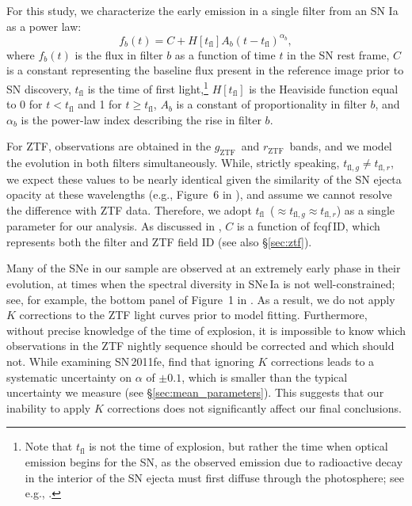 \documentclass[twocolumn]{./aastex63}
\newcommand{\rztf}{$r_\mathrm{ZTF}$}
\newcommand{\gztf}{$g_\mathrm{ZTF}$}
\newcommand{\tfl}{$t_\mathrm{fl}$}
\begin{document}
For this study, we characterize the early emission in a single filter from an
SN Ia as a power law:
%
\begin{equation}
    f_b(t) = C + H[t_\mathrm{fl}] A_b (t - t_\mathrm{fl})^{\alpha_b},
    \label{eqn:flux_model}
\end{equation}
%
where $f_b(t)$ is the flux in filter $b$ as a function of time $t$ in the SN
rest frame, $C$ is a constant representing the baseline flux present in the
reference image prior to SN discovery, $t_\mathrm{fl}$ is the time of first
light,\footnote{Note that $t_\mathrm{fl}$ is not the time of explosion, but
rather the time when optical emission begins for the SN, as the observed
emission due to radioactive decay in the interior of the SN ejecta must first
diffuse through the photosphere; see e.g., \citet{Piro13,Piro14}.}
$H[t_\mathrm{fl}]$ is the Heaviside function equal to 0 for $t <
t_\mathrm{fl}$ and 1 for $t \ge t_\mathrm{fl}$, $A_b$ is a constant of
proportionality in filter $b$, and $\alpha_b$ is the power-law index
describing the rise in filter $b$.

For ZTF, observations are obtained in the \gztf\ and \rztf\ bands, and we
model the evolution in both filters simultaneously. While, strictly speaking,
$t_{\mathrm{fl}, g} \ne t_{\mathrm{fl}, r}$, we expect these values to be
nearly identical given the similarity of the SN ejecta opacity at these
wavelengths (e.g., Figure~6 in \citealt{Magee18}), and assume we cannot
resolve the difference with ZTF data. Therefore, we adopt \tfl\ ($\approx
t_{\mathrm{fl}, g} \approx t_{\mathrm{fl}, r}$) as a single parameter for our
analysis. As discussed in \citet{Yao19}, $C$ is a function of fcqf\,ID, which
represents both the filter and ZTF field ID (see also \S\ref{sec:ztf}).

Many of the SNe in our sample are observed at an extremely early phase in
their evolution, at times when the spectral diversity in SNe\,Ia is not
well-constrained; see, for example, the bottom panel of Figure~1 in
\citet{Guy07}. As a result, we do not apply $K$ corrections to the ZTF light
curves prior to model fitting. Furthermore, without precise knowledge of the
time of explosion, it is impossible to know which observations in the ZTF
nightly sequence should be corrected and which should not. While examining
SN\,2011fe, \citet{Firth15} find that ignoring $K$ corrections leads to a
systematic uncertainty on $\alpha$ of $\pm0.1$, which is smaller than the
typical uncertainty we measure (see \S\ref{sec:mean_parameters}). This
suggests that our inability to apply $K$ corrections does not significantly
affect our final conclusions.
\end{document}
